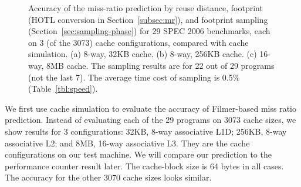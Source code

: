 \begin{figure}[h!]
  \centering
  \caption{Accuracy of the miss-ratio prediction by reuse distance,
    footprint (HOTL conversion in Section~\ref{subsec:mr}), and footprint sampling
    (Section~\ref{sec:sampling-phase}) for 29 SPEC 2006 benchmarks, each on
    3 (of the 3073) cache configurations, compared with cache
    simulation.  (a) 8-way, 32KB cache.  (b) 8-way, 256KB cache.  (c)
    16-way, 8MB cache.  The sampling results are for 22 out of 29
    programs (not the last 7).  The average time cost of sampling is
    0.5\% (Table~\ref{tbl:speed}).}
  \label{fig:spec_pred}
\end{figure} 

We first use cache simulation to evaluate the accuracy of Filmer-based
miss ratio prediction.  Instead of evaluating each of the 29 programs
on 3073 cache sizes, we show results for 3 configurations: 32KB, 8-way
associative L1D; 256KB, 8-way associative L2; and 8MB, 16-way
associative L3. They are the cache configurations on our test
machine. We will compare our prediction to the performance counter
result later. The cache-block size is 64 bytes in all cases.  The
accuracy for the other 3070 cache sizes looks similar.

